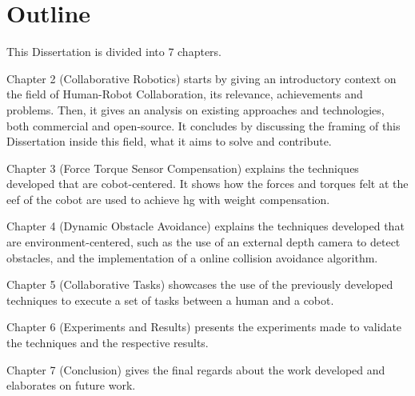 \section{Outline}


\par This Dissertation is divided into 7 chapters.
\par Chapter 2 (Collaborative Robotics) starts by giving an introductory context on the field of Human-Robot Collaboration, its relevance, achievements and problems. Then, it gives an analysis on existing approaches and technologies, both commercial and open-source. It concludes by discussing the framing of this Dissertation inside this field, what it aims to solve and contribute.
\par Chapter 3 (Force Torque Sensor Compensation) explains the techniques developed that are cobot-centered. It shows how the forces and torques felt at the \ac{eef} of the cobot are used to achieve \ac{hg} with weight compensation.
\par Chapter 4 (Dynamic Obstacle Avoidance) explains the techniques developed that are environment-centered, such as the use of an external depth camera to detect obstacles, and the implementation of a online collision avoidance algorithm.
\par Chapter 5 (Collaborative Tasks) showcases the use of the previously developed techniques to execute a set of tasks between a human and a cobot.
\par Chapter 6 (Experiments and Results) presents the experiments made to validate the techniques and the respective results.
\par Chapter 7 (Conclusion) gives the final regards about the work developed and elaborates on future work.

